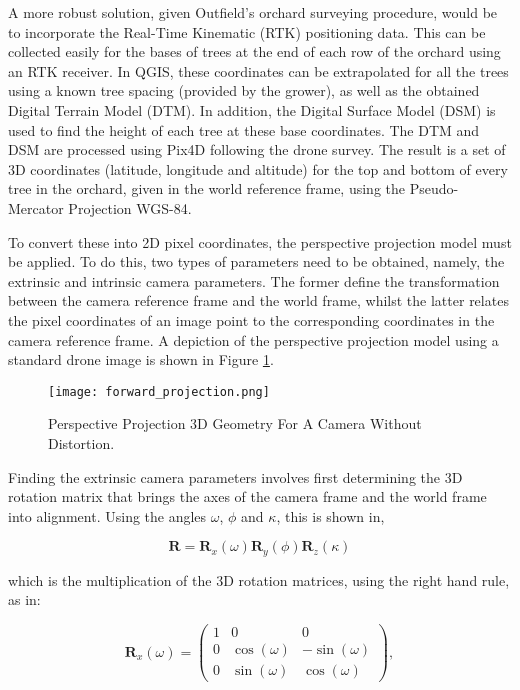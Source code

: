 \documentclass[journal]{IEEEtran}
\begin{document}
A more robust solution, given Outfield's orchard surveying procedure, would be to incorporate the Real-Time Kinematic (RTK) positioning data. This can be collected easily for the bases of trees at the end of each row of the orchard using an RTK receiver. In QGIS, these coordinates can be extrapolated for all the trees using a known tree spacing (provided by the grower), as well as the obtained Digital Terrain Model (DTM). In addition, the Digital Surface Model (DSM) is used to find the height of each tree at these base coordinates. The DTM and DSM are processed using Pix4D following the drone survey. The result is a set of 3D coordinates (latitude, longitude and altitude) for the top and bottom of every tree in the orchard, given in the world reference frame, using the Pseudo-Mercator Projection WGS-84. 

To convert these into 2D pixel coordinates, the perspective projection model must be applied. To do this, two types of parameters need to be obtained, namely, the extrinsic and intrinsic camera parameters. The former define the transformation between the camera reference frame and the world frame, whilst the latter relates the pixel coordinates of an image point to the corresponding coordinates in the camera reference frame. A depiction of the perspective projection model using a standard drone image is shown in Figure \ref{fig:fwd_proj}.


\begin{figure}[H]
    \centering
    \texttt{[image: forward\_projection.png]}
    \caption{Perspective Projection 3D Geometry For A Camera Without Distortion.}
    \label{fig:fwd_proj}
\end{figure}

Finding the extrinsic camera parameters involves first determining the 3D rotation matrix that brings the axes of the camera frame and the world frame into alignment. Using the angles $\omega$, $\phi$ and $\kappa$, this is shown in, 


\begin{equation}
\pmb{R} = \pmb{R}_{x}(\omega) \pmb{R}_{y}(\phi) \pmb{R}_{z}(\kappa)
\label{rotation1}
\end{equation}

which is the multiplication of the 3D rotation matrices, using the right hand rule, as in: 





\begin{equation}
\pmb{R}_{x}(\omega) = 
\begin{pmatrix} 1 & 0 & 0 \\ 0 & \cos(\omega) & -\sin(\omega) \\ 0 & \sin(\omega) & \cos(\omega) \end{pmatrix},
\label{rotmat1}
\end{equation}
\end{document}

